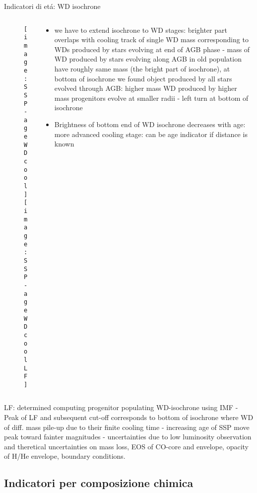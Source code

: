 \begin{frame}{Indicatori di et\'a: WD isochrone}
\begin{columns}[T]
	\begin{column}{0.3\textwidth}
		\begin{figure}[!ht]
			\texttt{[image: SSP-ageWDcool]}\label{fig:SSP-ageWDcool}
			\texttt{[image: SSP-ageWDcoolLF]}\label{fig:SSP-ageWDcoolLF}
		\end{figure}
	\end{column}
	\begin{column}{0.7\textwidth}
		\begin{itemize}
		\item we have to extend isochrone to WD stages: brighter part overlaps with cooling track of single WD mass corresponding to WDs produced by stars evolving at end of AGB phase - mass of WD produced by stars evolving along AGB in old population have roughly same mass (the bright part of isochrone), at bottom of isochrone we found object produced by all stars evolved through AGB: higher mass WD produced by higher mass progenitors evolve at smaller radii - left turn at bottom of isochrone
		\item Brightness of bottom end of WD isochrone decreases with age: more advanced cooling stage: can be age indicator if distance is known
		\end{itemize}
	\end{column}
\end{columns}
LF: determined computing progenitor populating WD-isochrone using IMF - Peak of LF and subsequent cut-off corresponds to bottom of isochrone where WD of diff. mass pile-up due to their finite cooling time - increasing age of SSP move peak toward fainter magnitudes - uncertainties due to low luminosity observation and theretical uncertainties on mass loss, EOS of CO-core and envelope, opacity of H/He envelope, boundary conditions.
\end{frame}

\subsection{Indicatori per composizione chimica}

